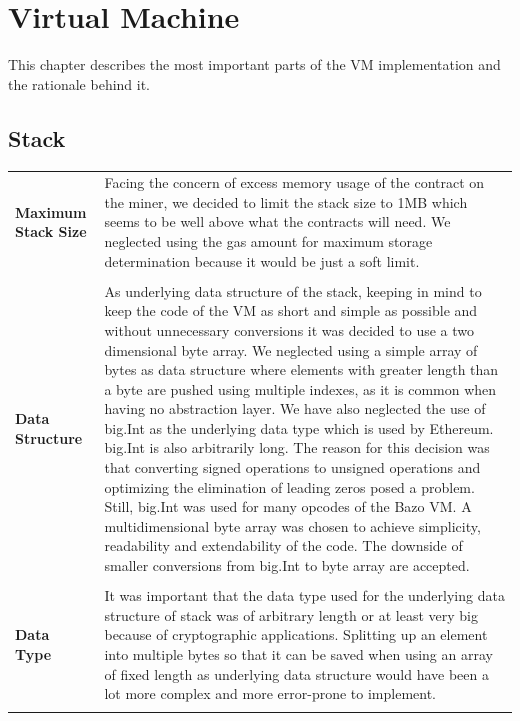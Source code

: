 
\section{Virtual Machine}
This chapter describes the most important parts of the VM implementation and the rationale behind it.

\subsection{Stack}
\begin{tabular}[t]{ p{3cm} p{12.5cm}}
\raggedright
\textbf{Maximum Stack Size} &
Facing the concern of excess memory usage of the contract on the miner, we decided to limit the stack size to 1MB which seems to be well above what the contracts will need. We neglected using the gas amount for maximum storage determination because it would be just a soft limit. \\ \\

\raggedright
\textbf{Data Structure} &
As underlying data structure of the stack, keeping in mind to keep the code of the VM as short and simple as possible and without unnecessary conversions it was decided to use a two dimensional byte array. We neglected using a simple array of bytes as data structure where elements with greater length than a byte are pushed using multiple indexes, as it is common when having no abstraction layer. We have also neglected the use of big.Int as the underlying data type which is used by Ethereum. big.Int is also arbitrarily long. The reason for this decision was that converting signed operations to unsigned operations and optimizing the elimination of leading zeros posed a problem. Still, big.Int was used for many opcodes of the Bazo VM. A multidimensional byte array was chosen to achieve simplicity, readability and extendability of the code. The downside of smaller conversions from big.Int to byte array are accepted. \\ \\

\raggedright
\textbf{Data Type} &
It was important that the data type used for the underlying data structure of stack was of arbitrary length or at least very big because of cryptographic applications. Splitting up an element into multiple bytes so that it can be saved when using an array of fixed length as underlying data structure would have been a lot more complex and more error-prone to implement. \\ \\


\end{tabular}

